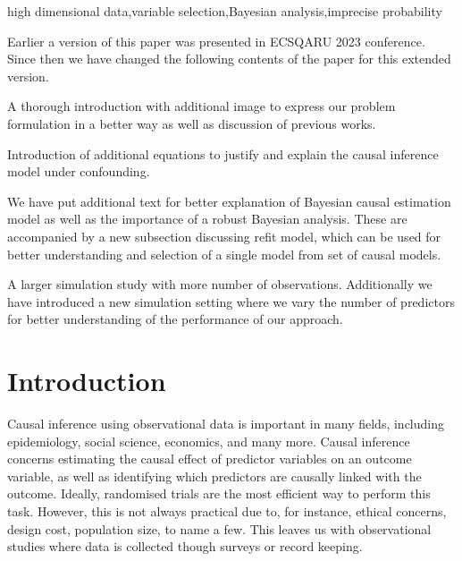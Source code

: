 \documentclass[preprint,12pt]{elsarticle}
\begin{document}
\begin{frontmatter}
\begin{keyword}
  high dimensional data\sep variable selection\sep Bayesian analysis\sep imprecise probability
\end{keyword}

\begin{highlights}
\item Earlier a version of this paper was presented in ECSQARU 2023 conference. 
Since then we have changed the following contents of the paper for this extended version. 
\item A thorough introduction with additional image to express our problem
formulation in a better way as well as discussion of previous works.
\item Introduction of additional equations to justify and explain the
causal inference model under confounding.
\item We have put additional text for better explanation of Bayesian causal
estimation model as well as the importance of a robust Bayesian analysis. These
are accompanied by a new subsection discussing refit model, which can be
used for better understanding and selection of a single model from set of causal models.
\item A larger simulation study with more number of observations. Additionally
we have introduced a new simulation setting where we vary the number of predictors
for better understanding of the performance of our approach.
\end{highlights}

\end{frontmatter}

\section{Introduction}\label{sec:intro}

Causal inference using observational data is important in
many fields, including epidemiology, social science, economics, and many more.
Causal inference concerns estimating the causal
effect of predictor variables on an outcome variable,
as well as identifying which predictors are causally linked with the outcome.
Ideally,
randomised trials are the most efficient way to perform this task.
However, this is not always practical due to, for instance, ethical 
concerns, design cost, population size, to name a few. This
leaves us with observational studies
where data is collected though surveys or record keeping.
\end{document}
